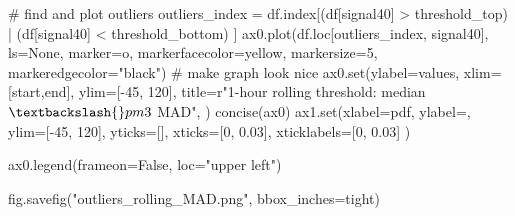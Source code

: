\documentclass[
  letterpaper,
  DIV=11,
  numbers=noendperiod,
  oneside]{scrreprt}
\newenvironment{Shaded}{\begin{snugshade}}{\end{snugshade}}
\newcommand{\BuiltInTok}[1]{\textcolor[rgb]{0.00,0.23,0.31}{#1}}
\newcommand{\CommentTok}[1]{\textcolor[rgb]{0.37,0.37,0.37}{#1}}
\newcommand{\DecValTok}[1]{\textcolor[rgb]{0.68,0.00,0.00}{#1}}
\newcommand{\FloatTok}[1]{\textcolor[rgb]{0.68,0.00,0.00}{#1}}
\newcommand{\NormalTok}[1]{\textcolor[rgb]{0.00,0.23,0.31}{#1}}
\newcommand{\OperatorTok}[1]{\textcolor[rgb]{0.37,0.37,0.37}{#1}}
\newcommand{\StringTok}[1]{\textcolor[rgb]{0.13,0.47,0.30}{#1}}
\newcommand{\VariableTok}[1]{\textcolor[rgb]{0.07,0.07,0.07}{#1}}
\newcommand{\VerbatimStringTok}[1]{\textcolor[rgb]{0.13,0.47,0.30}{#1}}
\begin{document}
\begin{Shaded}
\begin{Highlighting}[]
\CommentTok{\# find and plot outliers}
\NormalTok{outliers\_index }\OperatorTok{=}\NormalTok{ df.index[(df[}\StringTok{\textquotesingle{}signal40\textquotesingle{}}\NormalTok{] }\OperatorTok{\textgreater{}}\NormalTok{ threshold\_top) }\OperatorTok{|} 
\NormalTok{                          (df[}\StringTok{\textquotesingle{}signal40\textquotesingle{}}\NormalTok{] }\OperatorTok{\textless{}}\NormalTok{ threshold\_bottom)}
\NormalTok{                         ]}
\NormalTok{ax0.plot(df.loc[outliers\_index, }\StringTok{\textquotesingle{}signal40\textquotesingle{}}\NormalTok{], ls}\OperatorTok{=}\StringTok{\textquotesingle{}None\textquotesingle{}}\NormalTok{,}
\NormalTok{        marker}\OperatorTok{=}\StringTok{\textquotesingle{}o\textquotesingle{}}\NormalTok{, markerfacecolor}\OperatorTok{=}\StringTok{\textquotesingle{}yellow\textquotesingle{}}\NormalTok{, markersize}\OperatorTok{=}\DecValTok{5}\NormalTok{,}
\NormalTok{        markeredgecolor}\OperatorTok{=}\StringTok{"black"}\NormalTok{)}
\CommentTok{\# make graph look nice}
\NormalTok{ax0.}\BuiltInTok{set}\NormalTok{(ylabel}\OperatorTok{=}\StringTok{\textquotesingle{}values\textquotesingle{}}\NormalTok{,}
\NormalTok{       xlim}\OperatorTok{=}\NormalTok{[start,end],}
\NormalTok{       ylim}\OperatorTok{=}\NormalTok{[}\OperatorTok{{-}}\DecValTok{45}\NormalTok{, }\DecValTok{120}\NormalTok{],}
\NormalTok{       title}\OperatorTok{=}\VerbatimStringTok{r"1{-}hour rolling threshold: median $\textbackslash{}pm3$ MAD"}\NormalTok{,}
\NormalTok{       )}
\NormalTok{concise(ax0)}
\NormalTok{ax1.}\BuiltInTok{set}\NormalTok{(xlabel}\OperatorTok{=}\StringTok{\textquotesingle{}pdf\textquotesingle{}}\NormalTok{,}
\NormalTok{        ylabel}\OperatorTok{=}\StringTok{\textquotesingle{}\textquotesingle{}}\NormalTok{,}
\NormalTok{        ylim}\OperatorTok{=}\NormalTok{[}\OperatorTok{{-}}\DecValTok{45}\NormalTok{, }\DecValTok{120}\NormalTok{],}
\NormalTok{        yticks}\OperatorTok{=}\NormalTok{[],}
\NormalTok{        xticks}\OperatorTok{=}\NormalTok{[}\DecValTok{0}\NormalTok{, }\FloatTok{0.03}\NormalTok{],}
\NormalTok{        xticklabels}\OperatorTok{=}\NormalTok{[}\StringTok{\textquotesingle{}0\textquotesingle{}}\NormalTok{, }\StringTok{\textquotesingle{}0.03\textquotesingle{}}\NormalTok{]}
\NormalTok{        )}

\NormalTok{ax0.legend(frameon}\OperatorTok{=}\VariableTok{False}\NormalTok{, loc}\OperatorTok{=}\StringTok{"upper left"}\NormalTok{)}


\NormalTok{fig.savefig(}\StringTok{"outliers\_rolling\_MAD.png"}\NormalTok{, bbox\_inches}\OperatorTok{=}\StringTok{\textquotesingle{}tight\textquotesingle{}}\NormalTok{)}
\end{Highlighting}
\end{Shaded}
\end{document}
